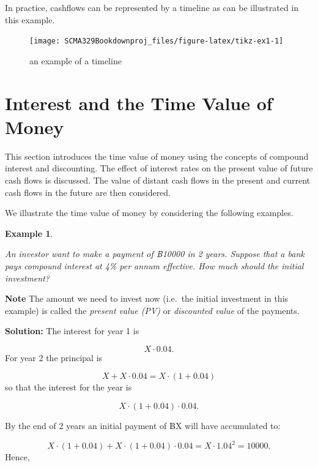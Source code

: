 \documentclass[
]{book}
\theoremstyle{definition}
\theoremstyle{definition}
\newtheorem{example}{Example}[chapter]
\theoremstyle{definition}
\theoremstyle{definition}
\theoremstyle{remark}
\begin{document}
In practice, cashflows can be represented by a timeline as can be
illustrated in this example.

\begin{figure}

{\centering \texttt{[image: SCMA329Bookdownproj\_files/figure-latex/tikz-ex1-1]} 

}

\caption{an example of a timeline}\label{fig:tikz-ex1}
\end{figure}

\hypertarget{interest-and-the-time-value-of-money}{%
\section{Interest and the Time Value of Money}\label{interest-and-the-time-value-of-money}}

This section introduces the time value of money using the concepts of
compound interest and discounting. The effect of interest rates on the
present value of future cash flows is discussed. The value of distant
cash flows in the present and current cash flows in the future are then
considered.

We illustrate the time value of money by considering the following
examples.

\begin{example}
\protect\hypertarget{exm:egpv}{}\label{exm:egpv}

\emph{An investor want to make a payment of ฿10000 in 2 years. Suppose that a
bank pays compound interest at 4\% per annum effective. How much should
the initial investment?}

\end{example}

\textbf{Note} The amount we need to invest now (i.e.~the initial investment
in this example) is called the \emph{present value (PV)} or \emph{discounted
value} of the payments.

\textbf{Solution:} The interest for year 1 is

\[ X \cdot 0.04.\] For year 2 the principal is

\[ X + X \cdot 0.04 = X \cdot (1 + 0.04)\] so that the interest for the
year is

\[ X \cdot (1 + 0.04) \cdot 0.04.\]

By the end of 2 years an initial payment of ฿X will have accumulated to:

\[X\cdot (1 + 0.04) + X \cdot (1 + 0.04) \cdot 0.04 =   X  \cdot  1.04^2 = 10000.\]
Hence,
\end{document}
